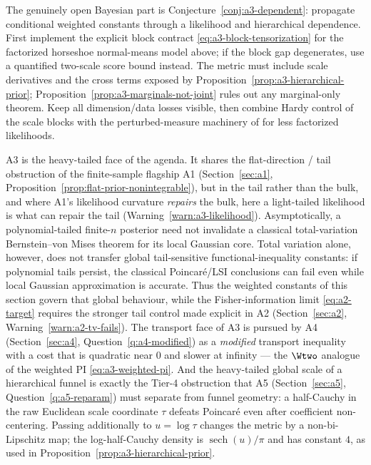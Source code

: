 \documentclass[../../main.tex]{subfiles}
\begin{document}
\begin{question}
\label{q:a3-hierarchical}
The genuinely open Bayesian part is Conjecture~\ref{conj:a3-dependent}: propagate conditional
weighted constants through a likelihood and hierarchical dependence.  First implement the
explicit block contract \eqref{eq:a3-block-tensorization} for the factorized horseshoe normal-means
model above; if the block gap degenerates, use a quantified two-scale score bound instead. The
metric must include scale derivatives and the cross terms exposed by
Proposition~\ref{prop:a3-hierarchical-prior}; Proposition~\ref{prop:a3-marginals-not-joint}
rules out any marginal-only theorem. Keep all dimension/data losses visible, then combine Hardy
control of the scale blocks with the perturbed-measure machinery of
\cite{CattiauxGuillin2022Perturbed} for less factorized likelihoods.
\end{question}

\begin{remark}
\label{rem:a3-relations}
A3 is the heavy-tailed face of the agenda. It shares the flat-direction / tail obstruction of the
finite-sample flagship A1 (Section~\ref{sec:a1}, Proposition~\ref{prop:flat-prior-nonintegrable}),
but in the tail rather than the bulk, and where A1's likelihood curvature \emph{repairs} the bulk,
here a light-tailed likelihood is what can repair the tail (Warning~\ref{warn:a3-likelihood}).
Asymptotically, a polynomial-tailed finite-$n$ posterior need not invalidate a classical
total-variation Bernstein--von Mises theorem for its local Gaussian core.  Total variation alone,
however, does not transfer global tail-sensitive functional-inequality constants: if polynomial
tails persist, the classical Poincar\'e/LSI conclusions can fail even while local Gaussian
approximation is accurate.  Thus the weighted constants of this section govern that global
behaviour, while the Fisher-information limit \eqref{eq:a2-target} requires the stronger tail
control made explicit in A2 (Section~\ref{sec:a2}, Warning~\ref{warn:a2-tv-fails}). The transport
face of A3 is pursued by A4 (Section~\ref{sec:a4},
Question~\ref{q:a4-modified}) as a
\emph{modified} transport inequality with a cost that is quadratic near $0$ and slower at infinity
--- the $\Wtwo$ analogue of the weighted PI \eqref{eq:a3-weighted-pi}. And the heavy-tailed global
scale of a hierarchical funnel is exactly the Tier-4 obstruction that A5
(Section~\ref{sec:a5}, Question~\ref{q:a5-reparam}) must separate from funnel geometry: a
half-Cauchy in the raw Euclidean scale coordinate $\tau$ defeats Poincar\'e even after coefficient
non-centering.  Passing additionally to $u=\log\tau$ changes the metric by a non-bi-Lipschitz map;
the log-half-Cauchy density is $\operatorname{sech}(u)/\pi$ and has constant $4$, as used in
Proposition~\ref{prop:a3-hierarchical-prior}.
\end{remark}
\end{document}
